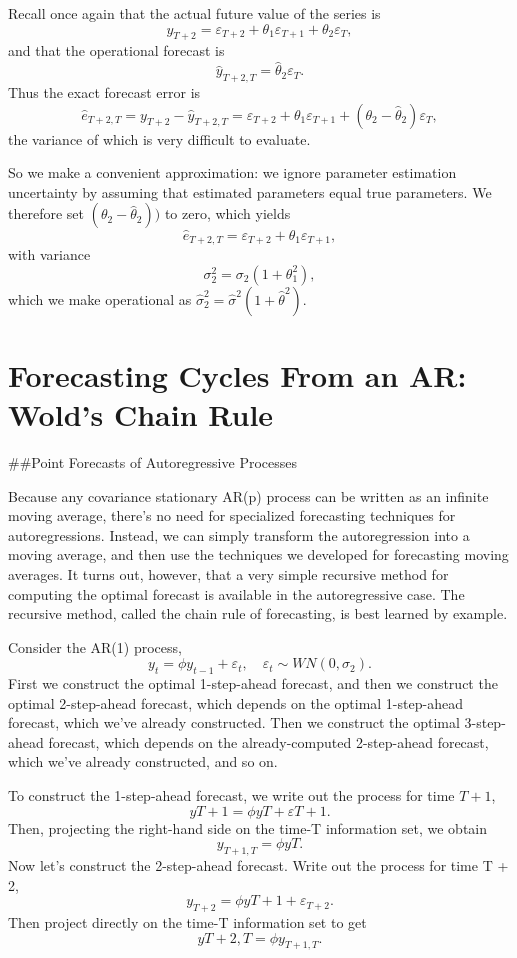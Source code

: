 \documentclass[]{article}
\begin{document}
Recall once again that the actual future value of the series is
\[y_{T+2} = \varepsilon_{T+2} + \theta_1 \varepsilon_{ T +1} + \theta_2 \varepsilon_ T ,\]
and that the operational forecast is
\[\hat y_{T +2,T} = \hat \theta_2 \varepsilon_T .\] Thus the exact
forecast error is
\[\hat e_{T +2,T} = y_{T+2} − \hat y_{T +2,T} = \varepsilon_{T+2} + \theta_1 \varepsilon_{T +1} + (\theta_2 -\hat \theta_2 )\varepsilon_ T ,\]
the variance of which is very difficult to evaluate.

So we make a convenient approximation: we ignore parameter estimation
uncertainty by assuming that estimated parameters equal true parameters.
We therefore set \((\theta_2 -\hat \theta_2 ))\) to zero, which yields
\[\hat e_{T +2,T}= \varepsilon_{T+2} + \theta_ 1 \varepsilon_{T +1} ,\]
with variance \[\sigma _2^2 = \sigma_2 (1 + \theta_1^2 ),\] which we
make operational as
\(\hat\sigma _2^2 = \hat\sigma ^2 (1 + \hat \theta^2).\)

\hypertarget{forecasting-cycles-from-an-ar-wolds-chain-rule}{%
\section{Forecasting Cycles From an AR: Wold's Chain
Rule}\label{forecasting-cycles-from-an-ar-wolds-chain-rule}}

\#\#Point Forecasts of Autoregressive Processes

Because any covariance stationary AR(p) process can be written as an
infinite moving average, there's no need for specialized forecasting
techniques for autoregressions. Instead, we can simply transform the
autoregression into a moving average, and then use the techniques we
developed for forecasting moving averages. It turns out, however, that a
very simple recursive method for computing the optimal forecast is
available in the autoregressive case. The recursive method, called the
chain rule of forecasting, is best learned by example.

Consider the AR(1) process,
\[y_ t = \phi y_{t−1} + \varepsilon_ t,\quad \varepsilon_ t ∼ W N (0, \sigma_2 ).\]First
we construct the optimal 1-step-ahead forecast, and then we construct
the optimal 2-step-ahead forecast, which depends on the optimal
1-step-ahead forecast, which we've already constructed. Then we
construct the optimal 3-step-ahead forecast, which depends on the
already-computed 2-step-ahead forecast, which we've already constructed,
and so on.

To construct the 1-step-ahead forecast, we write out the process for
time \(T + 1\), \[y T +1 = \phi y T + \varepsilon T +1 .\] Then,
projecting the right-hand side on the time-T information set, we obtain
\[y_{T +1,T} = \phi y T .\] Now let's construct the 2-step-ahead
forecast. Write out the process for time T + 2,
\[y_{T+2} = \phi y T +1 + \varepsilon_{T+2} .\] Then project directly on
the time-T information set to get \[y{T +2,T} = \phi y_{T +1,T} .\]
\end{document}
